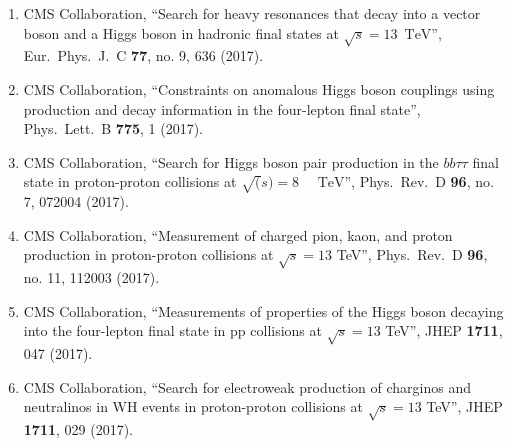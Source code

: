 \begin{itemize}
\begin{enumerate}
\item CMS Collaboration, ``Search for heavy resonances that decay into a vector boson and a Higgs boson in hadronic final states at $\sqrt{s} = 13$ $\,\text {TeV}$'', Eur.\ Phys.\ J.\ C {\bf 77}, no. 9, 636 (2017).

\item CMS Collaboration, ``Constraints on anomalous Higgs boson couplings using production and decay information in the four-lepton final state'', Phys.\ Lett.\ B {\bf 775}, 1 (2017).

\item CMS Collaboration, ``Search for Higgs boson pair production in the $bb\tau\tau$ final state in proton-proton collisions at $\sqrt{(}s)=8\text{ }\text{ }\mathrm{TeV}$'', Phys.\ Rev.\ D {\bf 96}, no. 7, 072004 (2017).

\item CMS Collaboration, ``Measurement of charged pion, kaon, and proton production in proton-proton collisions at $\sqrt{s}=13$ TeV'', Phys.\ Rev.\ D {\bf 96}, no. 11, 112003 (2017).

\item CMS Collaboration, ``Measurements of properties of the Higgs boson decaying into the four-lepton final state in pp collisions at $ \sqrt{s}=13 $ TeV'', JHEP {\bf 1711}, 047 (2017).

\item CMS Collaboration, ``Search for electroweak production of charginos and neutralinos in WH events in proton-proton collisions at $ \sqrt{s}=13 $ TeV'', JHEP {\bf 1711}, 029 (2017).


\end{enumerate}
\end{itemize}
